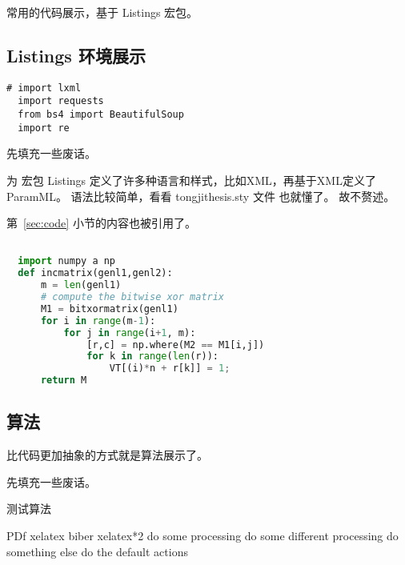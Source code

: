 \documentclass[UTF8,AutoFakeBold,zihao=-4,scheme=chinese]{ctexart}
\begin{document}
常用的代码展示，基于 Listings 宏包。

\subsection{Listings 环境展示}
\label{ssc:listings}

\begin{lstlisting}[style=monocolor,
  caption={first lst env},
  label={no label},
  name=测试第一个代码,
  language=PythonPlus]
  # import lxml
  import requests
  from bs4 import BeautifulSoup
  import re
\end{lstlisting}

先填充一些废话。\zhlipsum[8]

为 宏包 Listings 定义了许多种语言和样式，比如XML，再基于XML定义了 ParamML。
语法比较简单，看看 tongjithesis.sty 文件 也就懂了。
故不赘述。

第~\ref{sec:code} 小节的内容也被引用了。

\begin{lstlisting}[language=Python,
  caption=中文标题没有括号,
  label=lst:outer,
  style=colored]

  import numpy a np
  def incmatrix(genl1,genl2):
      m = len(genl1)
      # compute the bitwise xor matrix
      M1 = bitxormatrix(genl1)
      for i in range(m-1):
          for j in range(i+1, m):
              [r,c] = np.where(M2 == M1[i,j])
              for k in range(len(r)):
                  VT[(i)*n + r[k]] = 1;
      return M
\end{lstlisting}

\subsection{算法}

比代码更加抽象的方式就是算法展示了。

先填充一些废话。\zhlipsum[7]

\begin{minipage}{0.75\textwidth}

\begin{algorithm}[H]
  \caption{测试算法}
  \label{alg:test}
    \begin{algorithmic}[1]
      \REQUIRE PDf
      \ENSURE xelatex biber xelatex*2
      \STATE do some processing
      \STATE do some different processing
      \STATE do something else
      \ELSE
      \STATE do the default actions
      \ENDIF
    \end{algorithmic}
  \end{algorithm}

\end{minipage}
\newline
\end{document}
